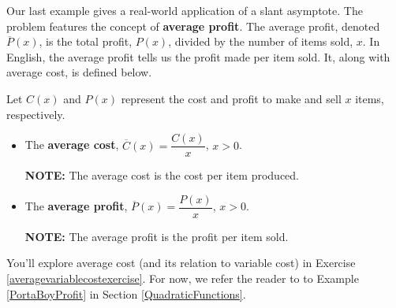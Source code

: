 \documentclass{ximera}
\begin{document}
Our last example gives a real-world application of a slant asymptote. The problem features the concept of \textbf{average profit}. The average profit, denoted $\overline{P}(x)$,  is the total profit, $P(x)$,  divided by the number of items sold, $x$. In English, the average profit tells us the profit made per item sold. It, along with average cost, is defined below.

\colorbox{ResultColor}{\bbm

\begin{defn} \label{averagecostprofit} Let $C(x)$ and $P(x)$ represent the cost and profit to make and sell $x$ items, respectively.

\begin{itemize}

\item    The  \textbf{average cost}, $\overline{C}(x) = \dfrac{C(x)}{x}$, $x > 0$.  

\textbf{NOTE:}  The average cost is the cost per item produced.

\item   The  \textbf{average profit}, $\overline{P}(x) = \dfrac{P(x)}{x}$, $x > 0$.  

\textbf{NOTE:}  The average profit is the profit  per item sold.

\end{itemize}

\end{defn}

\ebm}

You'll explore average cost (and its relation to variable cost) in Exercise \ref{averagevariablecostexercise}.  For now, we refer the reader to to Example \ref{PortaBoyProfit}  in Section \ref{QuadraticFunctions}.
\end{document}

